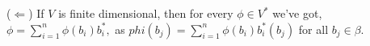 ($\Leftarrow$) If $V$ is finite dimensional, then for every $\phi \in V^*$ we've got,
$\phi = \sum_{i=1}^{n} \phi(b_i)b_i^*,$
as $phi(b_j) = \sum_{i=1}^{n} \phi(b_i) b_i^* (b_j)$ for all $b_j \in \beta$.
